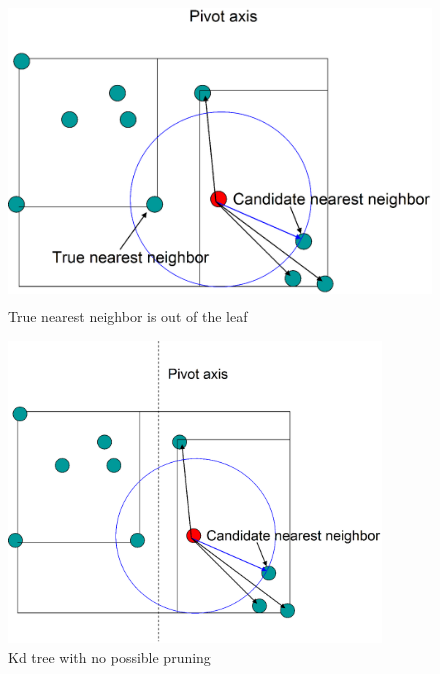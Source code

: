 \documentclass[12pt,letterpaper,doublespaced,ETD,dvips,proposal]{gtthesis}
\begin{document}
\begin{Body}

\begin{figure}[!htb]
\label{nearest_neighbor_searchon_kd_true_neighbor}
\centerline{\includegraphics[height=8cm]{nearest_neighbor_searchon_kd_true_neighbor.eps}}
\caption{True nearest neighbor is out of the leaf}
\end{figure}


\begin{figure}[!htb]
\label{nearest_neighbor_searchon_kd_no_prune}
\centerline{\includegraphics[height=8cm]{nearest_neighbor_searchon_kd_no_prune.eps}}
\caption{Kd tree with no possible pruning}
\end{figure}



\end{Body}
\end{document}
